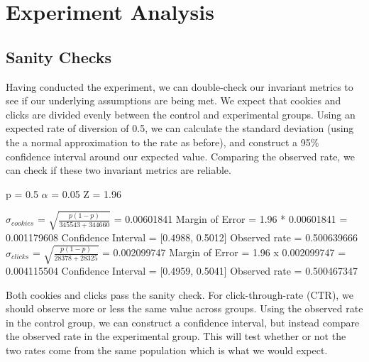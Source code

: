 \documentclass[paper=a4, fontsize=11pt]{scrartcl} %
\numberwithin{equation}{section} %
\numberwithin{figure}{section} %
\numberwithin{table}{section} %
\begin{document}


\section{Experiment Analysis}

\subsection{Sanity Checks}

Having conducted the experiment, we can double-check our invariant metrics to see if our underlying assumptions are being met.  We expect that cookies and clicks are divided evenly between the control and experimental groups.  Using an expected rate of diversion of 0.5, we can calculate the standard deviation (using the a normal approximation to the rate as before), and construct a 95\% confidence interval around our expected value.  Comparing the observed rate, we can check if these two invariant metrics are reliable.\newline

p = 0.5\quad
$\alpha$ = 0.05\quad
Z = 1.96
\newline

$\sigma_{cookies}$ = $\sqrt{\frac{p(1-p)}{345543 + 344660}}$ = 0.00601841
\newline
Margin of Error = 1.96 * 0.00601841 = 0.001179608
\newline
Confidence Interval = [0.4988, 0.5012]
\newline
Observed rate = 0.500639666
\newline
\newline
$\sigma_{clicks}$ = $\sqrt{\frac{p(1-p)}{28378 + 28325}}$ = 0.002099747
\newline
Margin of Error = 1.96 x 0.002099747 = 0.004115504
\newline
Confidence Interval = [0.4959, 0.5041]
\newline
Observed rate = 0.500467347
\newline

Both cookies and clicks pass the sanity check.  For click-through-rate (CTR), we should observe more or less the same value across groups.  Using the observed rate in the control group, we can construct a confidence interval, but instead compare the observed rate in the experimental group.  This will test whether or not the two rates come from the same population which is what we would expect.
\newline
\end{document}
